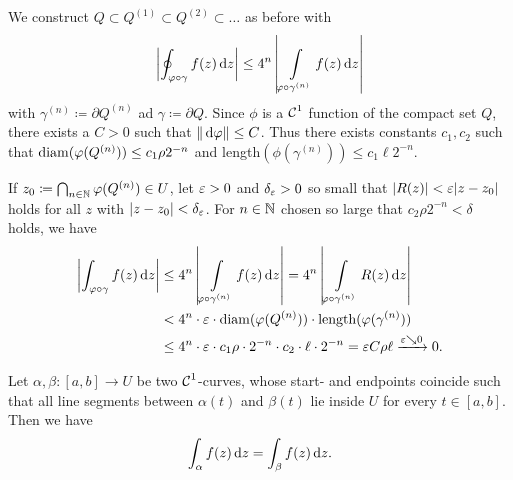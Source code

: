 \documentclass[a4paper,english]{article}
\begin{document}
\begin{pr}
    We construct $Q \subset Q^{(1)} \subset Q^{(2)} \subset \ldots$ as before with
    \begin{equation*}
        \left| \oint_{\varphi \circ \gamma} f(z) \mathop{}\!\mathrm{d}{z} \right|
        \le 4^n \left| \int\limits_{\varphi \circ \gamma^{(n)}} f(z) \mathop{}\!\mathrm{d}{z}\right|
    \end{equation*}
    with $\gamma^{(n)} \coloneqq \partial Q^{(n)}$ ad $\gamma \coloneqq \partial Q$.
    Since $\phi$ is a $\operatorname{\mathcal{C}}^1$ function of the compact set $Q$, there exists a $C > 0$ such that $\| \mathop{}\!\mathrm{d}{\varphi} \| \le C$.
    Thus there exists constants $c_1, c_2$ such that $\operatorname{diam}(\varphi(Q^{(n)})) \le c_1 \rho 2^{-n}$ and length$(\phi(\gamma^{(n)})) \le c_1 \ell 2^{-n}$.
    
    If $z_0 \coloneqq \bigcap_{n \in \operatorname{\mathbb{N}}} \varphi(Q^{(n)}) \in U$, let $\varepsilon > 0$ and $\delta_{\varepsilon} > 0$ so small that $| R(z) | < \varepsilon | z - z_0 |$ holds for all $z$ with $|z - z_0 | < \delta_{\varepsilon}$.
    For $n \in \operatorname{\mathbb{N}}$ chosen so large that $c_2 \rho 2^{-n} < \delta$ holds, we have
    \begin{align*}
        \left| \int_{\varphi \circ \gamma} f(z) \mathop{}\!\mathrm{d}{z} \right|
        & \le 4^n \left| \int\limits_{\varphi \circ \gamma^{(n)}} f(z) \mathop{}\!\mathrm{d}{z}\right|
        = 4^n \left| \int\limits_{\varphi \circ \gamma^{(n)}} R(z) \mathop{}\!\mathrm{d}{z}\right| \\
        & < 4^n \cdot \varepsilon \cdot \operatorname{diam}(\varphi(Q^{(n)})) \cdot \text{length}(\varphi(\gamma^{(n)})) \\
        & \le 4^n \cdot \varepsilon \cdot c_1 \rho \cdot 2^{-n} \cdot c_2 \cdot \ell \cdot 2^{-n}
        = \varepsilon C \rho \ell 
        \xrightarrow{\varepsilon \searrow 0} 0.
    \end{align*}
\end{pr}

\begin{cor}
    Let $\alpha, \beta\colon [a, b] \to U$ be two $\operatorname{\mathcal{C}}^1$-curves, whose start- and endpoints coincide such that all line segments between $\alpha(t)$ and  $\beta(t)$ lie inside $U$ for every $t \in [a, b]$.
    Then we have
    \begin{equation*}
        \int_{\alpha} f(z) \mathop{}\!\mathrm{d}{z}
        = \int_{\beta} f(z) \mathop{}\!\mathrm{d}{z}.
    \end{equation*}
\end{cor}
\end{document}
